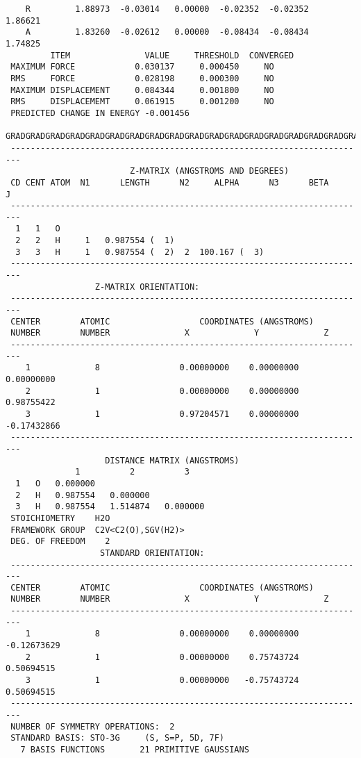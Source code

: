 {\begin{verbatim}
    R         1.88973  -0.03014   0.00000  -0.02352  -0.02352   1.86621
    A         1.83260  -0.02612   0.00000  -0.08434  -0.08434   1.74825
         ITEM               VALUE     THRESHOLD  CONVERGED
 MAXIMUM FORCE            0.030137     0.000450     NO 
 RMS     FORCE            0.028198     0.000300     NO 
 MAXIMUM DISPLACEMENT     0.084344     0.001800     NO 
 RMS     DISPLACEMEMT     0.061915     0.001200     NO 
 PREDICTED CHANGE IN ENERGY -0.001456
 GRADGRADGRADGRADGRADGRADGRADGRADGRADGRADGRADGRADGRADGRADGRADGRADGRADGRAD
 ------------------------------------------------------------------------
                         Z-MATRIX (ANGSTROMS AND DEGREES)
 CD CENT ATOM  N1      LENGTH      N2     ALPHA      N3      BETA       J
 ------------------------------------------------------------------------
  1   1   O 
  2   2   H     1   0.987554 (  1)
  3   3   H     1   0.987554 (  2)  2  100.167 (  3)
 ------------------------------------------------------------------------
                  Z-MATRIX ORIENTATION:
 ------------------------------------------------------------------------
 CENTER        ATOMIC                  COORDINATES (ANGSTROMS)
 NUMBER        NUMBER               X             Y             Z
 ------------------------------------------------------------------------
    1             8                0.00000000    0.00000000    0.00000000
    2             1                0.00000000    0.00000000    0.98755422
    3             1                0.97204571    0.00000000   -0.17432866
 ------------------------------------------------------------------------
                    DISTANCE MATRIX (ANGSTROMS)
              1          2          3
  1   O   0.000000
  2   H   0.987554   0.000000
  3   H   0.987554   1.514874   0.000000
 STOICHIOMETRY    H2O
 FRAMEWORK GROUP  C2V<C2(O),SGV(H2)>
 DEG. OF FREEDOM    2
                   STANDARD ORIENTATION:
 ------------------------------------------------------------------------
 CENTER        ATOMIC                  COORDINATES (ANGSTROMS)
 NUMBER        NUMBER               X             Y             Z
 ------------------------------------------------------------------------
    1             8                0.00000000    0.00000000   -0.12673629
    2             1                0.00000000    0.75743724    0.50694515
    3             1                0.00000000   -0.75743724    0.50694515
 ------------------------------------------------------------------------
 NUMBER OF SYMMETRY OPERATIONS:  2
 STANDARD BASIS: STO-3G     (S, S=P, 5D, 7F)
   7 BASIS FUNCTIONS       21 PRIMITIVE GAUSSIANS

\end{verbatim}}
